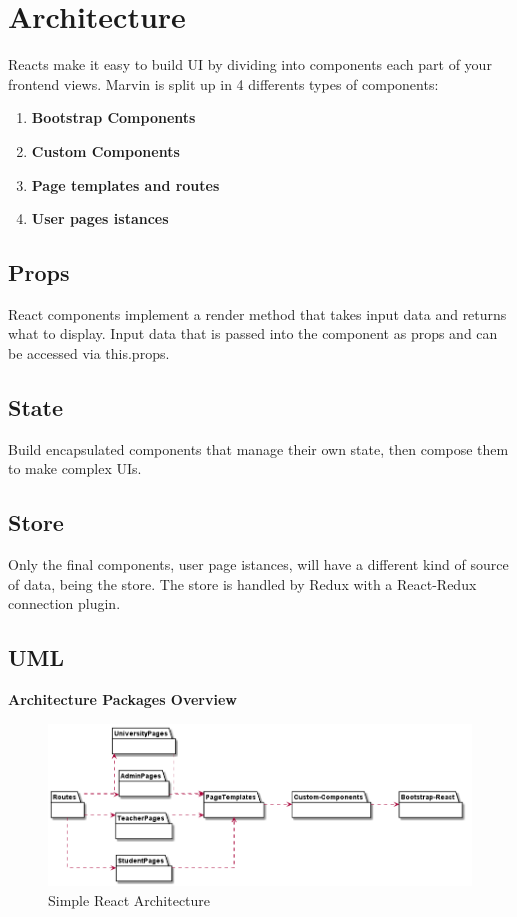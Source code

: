 \documentclass[../react.tex]{subfiles}
\begin{document}
	
	\section{Architecture}

	Reacts make it easy to build UI by dividing into components each part of your frontend views.
	Marvin is split up in 4 differents types of components:
	\begin{enumerate} 
		\item \textbf{Bootstrap Components}
		\item \textbf{Custom Components}
		\item \textbf{Page templates and routes}
		\item \textbf{User pages istances}
	\end{enumerate} 

	\subsection{Props}
	React components implement a render method that takes input data and returns what to display.
	Input data that is passed into the component as props and can be accessed via this.props.

	\subsection{State}
	Build encapsulated components that manage their own state, then compose them to make complex UIs.

	\subsection{Store}
	Only the final components, user page istances, will have a different kind of source of data, being the store.
	The store is handled by Redux with a React-Redux connection plugin.
	
	\subsection{UML} %
	
	\textbf{Architecture Packages Overview}
	\begin{figure}[H]
		\centering
		\includegraphics[width=1\linewidth]{"diagrammi/react/simplearch"}
		\caption{Simple React Architecture}
		\label{fig:Simple React Architecture}
	\end{figure}
	
\end{document}
